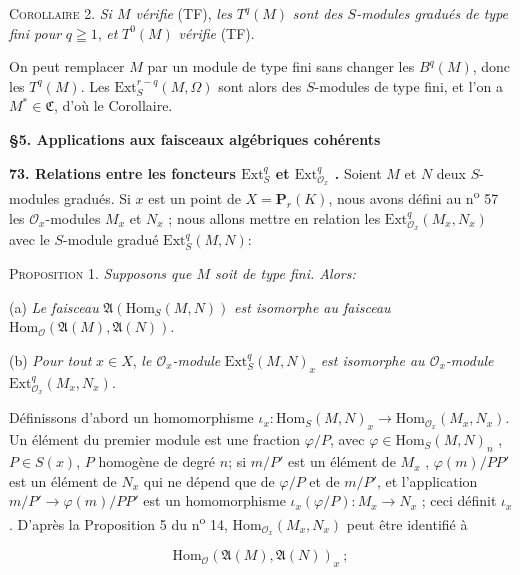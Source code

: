 \textsc{Corollaire} 2. \textit{Si $M$ vérifie} (TF), \textit{les} $T^q(M)$ \textit{sont des $S$-modules gradués de type fini pour} $q \geqq 1$, \textit{et} $T^0(M)$ \textit{vérifie} (TF).

On peut remplacer $M$ par un module de type fini sans changer les $B^q(M)$, donc les $T^q(M)$. Les $\mathrm{Ext}_S^{r-q}(M, \Omega)$ sont alors des $S$-modules de type fini, et l'on a $M^* \in \mathfrak{C}$, d'où le Corollaire.

\begin{center}
\textbf{\S5. Applications aux faisceaux algébriques cohérents}
\end{center}

\textbf{73. Relations entre les foncteurs $\mathrm{Ext}_S^q$ et $\mathrm{Ext}_{\mathcal{O}_x}^q$ .} Soient $M$ et $N$ deux $S$-modules gradués. Si $x$ est un point de $X = \mathbf{P}_r(K)$, nous avons défini au n\textsuperscript{o} 57 les $\mathcal{O}_x$-modules $M_x$ et $N_x$ ; nous allons mettre en relation les $\mathrm{Ext}_{\mathcal{O}_x}^q(M_x , N_x)$ avec le $S$-module gradué $\mathrm{Ext}_S^q(M, N)$:

\textsc{Proposition} 1. \textit{Supposons que $M$ soit de type fini. Alors:}

(a) \textit{Le faisceau} $\mathfrak{A}(\mathrm{Hom}_S(M, N))$ \textit{est isomorphe au faisceau} $\mathrm{Hom}_{\mathcal{O}}(\mathfrak{A}(M), \mathfrak{A}(N))$.

(b) \textit{Pour tout} $x \in X$, \textit{le $\mathcal{O}_x$-module} $\mathrm{Ext}_S^q(M, N)_x$ \textit{est isomorphe au $\mathcal{O}_x$-module} $\mathrm{Ext}_{\mathcal{O}_x}^q(M_x , N_x)$.

Définissons d'abord un homomorphisme $\iota_x: \mathrm{Hom}_S(M, N)_x \rightarrow \mathrm{Hom}_{\mathcal{O}_x}(M_x , N_x)$. Un élément du premier module est une fraction $\varphi/P$, avec $\varphi \in \mathrm{Hom}_S(M, N)_n$ , $P \in S(x)$, $P$ homogène de degré $n$; si $m/P'$ est un élément de $M_x$ , $\varphi(m)/PP'$ est un élément de $N_x$ qui ne dépend que de $\varphi/P$ et de $m/P'$, et l'application $m/P' \rightarrow \varphi(m)/PP'$ est un homomorphisme $\iota_x(\varphi/P): M_x \rightarrow N_x$ ; ceci définit $\iota_x$ . D'après la Proposition 5 du n\textsuperscript{o} 14, $\mathrm{Hom}_{\mathcal{O}_x}(M_x , N_x)$ peut être identifié à

\begin{equation*}
\mathrm{Hom}_{\mathcal{O}}(\mathfrak{A}(M), \mathfrak{A}(N))_x \ ;
\end{equation*}

